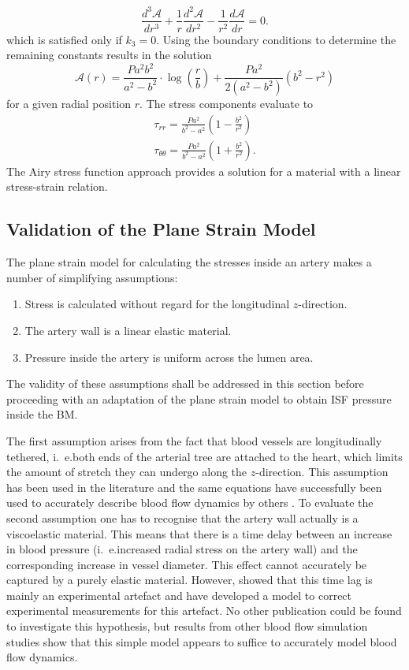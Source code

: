 \documentclass{frontiers_suppmat} %
\newcommand{\beq}{\begin{equation}}
\newcommand{\eeq}{\end{equation}}
\newcommand{\taurr}{\tau_{rr}}
\newcommand{\tautt}{\tau_{\theta\theta}}
\newcommand{\Airy}{\mathcal{A}}
\newcommand{\ie}{i.~e.}
\begin{document}
\beq
\frac{d^3 \Airy}{dr^3} + \frac{1}{r} \frac{d^2 \Airy}{dr^2} - \frac{1}{r^2} \frac{d\Airy}{dr} = 0.
\eeq
which is satisfied only if $k_3 = 0$. Using the boundary conditions to determine the remaining constants results in the solution
\beq
\Airy(r) = \frac{P a^2 b^2}{a^2 - b^2} \cdot \log \left( \frac{r}{b} \right) + \frac{P a^2}{2 (a^2 - b^2)} \left( b^2 - r^2 \right)
\eeq
for a given radial position $r$. The stress components evaluate to
\begin{gather}
\taurr = \frac{P a^2}{b^2 - a^2} \left( 1 - \frac{b^2}{r^2} \right)\label{eq:taurr_airy}\\
\tautt = \frac{P a^2}{b^2 - a^2} \left( 1 + \frac{b^2}{r^2} \right).
\end{gather}
The Airy stress function approach provides a solution for a material with a linear stress-strain relation.


\subsection{Validation of the Plane Strain Model}

The plane strain model for calculating the stresses inside an artery makes a number of simplifying assumptions:
\begin{enumerate}
\item Stress is calculated without regard for the longitudinal $z$-direction.
\item The artery wall is a linear elastic material.
\item Pressure inside the artery is uniform across the lumen area.
\end{enumerate}
The validity of these assumptions shall be addressed in this section before proceeding with an adaptation of the plane strain model to obtain ISF pressure inside the BM.

The first assumption arises from the fact that blood vessels are longitudinally tethered, \ie both ends of the arterial tree are attached to the heart, which limits the amount of stretch they can undergo along the $z$-direction. This assumption has been used in the literature and the same equations have successfully been used to accurately describe blood flow dynamics by others \cite{Olufsen2000,Kolachalama2007,Devault2008,Cousins2014}. To evaluate the second assumption one has to recognise that the artery wall actually is a viscoelastic material. This means that there is a time delay between an increase in blood pressure (\ie increased radial stress on the artery wall) and the corresponding increase in vessel diameter. This effect cannot accurately be captured by a purely elastic material. However, \cite{Tardy1991} showed that this time lag is mainly an experimental artefact and have developed a model to correct experimental measurements for this artefact. No other publication could be found to investigate this hypothesis, but results from other blood flow simulation studies show that this simple model appears to suffice to accurately model blood flow dynamics.
\end{document}

